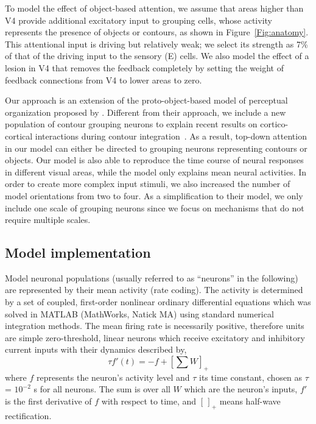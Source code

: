 To model the effect of object-based attention, we assume that areas higher than V4 provide additional excitatory input to grouping cells, whose activity represents the presence of objects or contours, as shown in Figure~\ref{Fig:anatomy}. This attentional input is driving but relatively weak; we select its strength as 7\% of that of the driving input to the sensory (E) cells. We also model the effect of a lesion in V4 that removes the feedback completely by setting the weight of
feedback connections from V4 to lower areas  to zero.

Our approach is an extension of the proto-object-based model of perceptual organization proposed by \cite{Mihalas_etal11b}. Different from their approach, we include a new population of contour grouping neurons to explain recent results on cortico-cortical interactions during contour integration~\citep{Chen_etal14}. As a result, top-down attention in our model can either be directed to grouping neurons representing contours or objects. Our model is also able to reproduce
the time course of neural responses in different visual areas, while the \cite{Mihalas_etal11b} model only explains mean neural activities. In order to create more complex input stimuli, we also
increased the number of model orientations from two to four. As a simplification to their model, we only include one scale of grouping neurons since we focus on mechanisms that do not require multiple
scales.

\subsection{Model implementation}
\label{sec:implementation}

Model neuronal populations (usually referred to as ``neurons'' in the
following) are represented by their mean activity (rate coding).  The
activity is determined by a set of coupled, first-order nonlinear
ordinary differential equations which was solved in MATLAB (MathWorks,
Natick MA) using standard numerical integration methods.  The mean
firing rate is necessarily positive, therefore units are simple
zero-threshold, linear neurons which receive excitatory and inhibitory
current inputs with their dynamics described by,
\begin{equation}
\label{eq:1}
\tau f'(t) = -f + \left[ \sum W \right]_{+}
\end{equation}
where $f$ represents the neuron's activity level and $\tau$ its time
constant, chosen as $\tau$ = $10^{-2}$ s for all neurons. The sum is
over all $W$ which are the neuron's inputs,
$f'$ is the first derivative of $f$ with respect to
time, and $[\,]_{+}$ means half-wave rectification.

